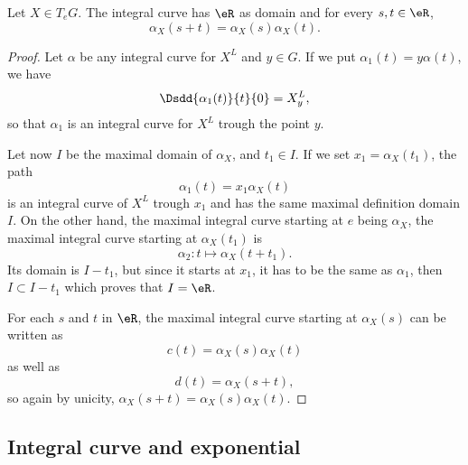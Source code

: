 \begin{proposition}     \label{PROPooWEYCooCvyHNr}
    Let \( X\in T_eG\). The integral curve has \( \eR\) as domain and for every \( s,t\in\eR\),
    \begin{equation}
        \alpha_X(s+t)=\alpha_X(s)\alpha_X(t).
    \end{equation}
\end{proposition}

\begin{proof}
    Let \( \alpha\) be any integral curve for \( X^L\) and \( y\in G\). If we put \( \alpha_1(t)=y\alpha(t)\), we have
    \begin{equation}
        \Dsdd{ \alpha_1(t) }{t}{0}=X^L_y,
    \end{equation}
    so that \( \alpha_1\) is an integral curve for \( X^L\) trough the point \( y\).

    Let now \( I\) be the maximal domain of \( \alpha_X\), and \( t_1\in I\). If we set \( x_1=\alpha_X(t_1)\), the path
    \begin{equation}
         \alpha_1(t)=x_1\alpha_X(t)
    \end{equation}
    is an integral curve of \( X^L\) trough \( x_1\) and has the same maximal definition domain \( I\). On the other hand, the maximal integral curve starting at \( e\) being \( \alpha_X\), the maximal integral curve starting at \( \alpha_X(t_1)\) is
    \begin{equation}
        \alpha_2\colon t\mapsto \alpha_X(t+t_1).
    \end{equation}
    Its domain is \( I-t_1\), but since it starts at \( x_1\), it has to be the same as \( \alpha_1\), then \( I\subset I-t_1\) which proves that \( I=\eR\).

    For each \( s\) and \( t\) in \( \eR\), the maximal integral curve starting at \( \alpha_X(s)\) can be written as
    \begin{equation}
        c(t)=\alpha_X(s)\alpha_X(t)
    \end{equation}
    as well as
    \begin{equation}
        d(t)=\alpha_X(s+t),
    \end{equation}
    so again by unicity, \( \alpha_X(s+t)=\alpha_X(s)\alpha_X(t)\).
\end{proof}


\subsection{Integral curve and exponential}

